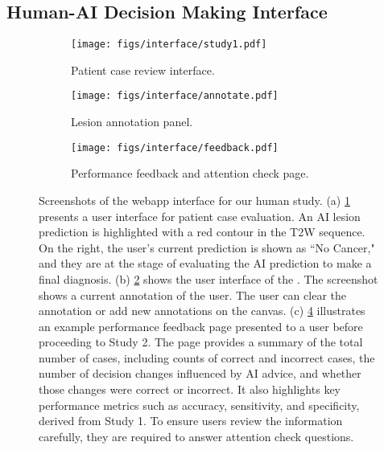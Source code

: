 \subsection{Human-AI Decision Making Interface}

\begin{figure}[t]
    \centering
    \begin{minipage}[b]{0.5\textwidth}
        \begin{subfigure}[b]{\textwidth}
            \texttt{[image: figs/interface/study1.pdf]}
            \caption{Patient case review interface.}
            \label{fig:study1_interface}
        \end{subfigure}
        \begin{subfigure}[b]{\textwidth}
            \texttt{[image: figs/interface/annotate.pdf]}
            \caption{Lesion annotation panel.}
            \label{fig:annotate}
        \end{subfigure}
    \end{minipage}
    \begin{subfigure}[b]{0.465\textwidth}
        \texttt{[image: figs/interface/feedback.pdf]}
        \caption{Performance feedback and attention check page.}
        \label{fig:feedback}
    \end{subfigure}
    \caption{
    Screenshots of the webapp interface for our human study.
    (a) \cref{fig:study1_interface} presents a user interface for patient case evaluation.
    An AI lesion prediction is highlighted with a red contour in the T2W sequence. On the right, the user's current prediction is shown as ``No Cancer," and they are at the stage of evaluating the AI prediction to make a final diagnosis. 
    (b) \cref{fig:annotate} shows the user interface of the \ap.
    The screenshot shows a current annotation of the user.
    The user can clear the annotation or add new annotations on the canvas.
    (c) \cref{fig:feedback} illustrates an example performance feedback page presented to a user before proceeding to Study 2. 
    The page provides a summary of the total number of cases, including counts of correct and incorrect cases, the number of decision changes influenced by AI advice, and whether those changes were correct or incorrect. It also highlights key performance metrics such as accuracy, sensitivity, and specificity, derived from Study 1.
    To ensure users review the information carefully, they are required to answer attention check questions.
    }
\end{figure}

